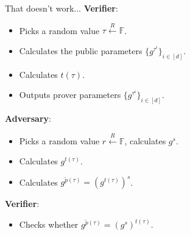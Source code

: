 \documentclass{zkdl-presentation-template}
\begin{document}
    \begin{frame}{That doesn't work...}
        \textbf{Verifier}: 
        \vspace{-5pt}
        \begin{itemize}[label=]
            \item \vspace{-3pt} Picks a random value $\tau \xleftarrow{R} \mathbb{F}$. \pause
            \item \vspace{-3pt} Calculates the public parameters $\{g^{\tau^i}\}_{i \in [d]}$. \pause
            \item \vspace{-3pt} Calculates $t(\tau)$. \pause
            \item \vspace{-3pt} Outputs prover parameters $\{g^{\tau^i}\}_{i \in [d]}$. \pause
        \end{itemize}
        \textbf{Adversary}: 
        \vspace{-5pt}
        \begin{itemize}[label=]
            \item \vspace{-3pt} Picks a random value $r \xleftarrow{R} \mathbb{F}$, calculates $g^s$. \pause
            \item \vspace{-3pt} Calculates $g^{t(\tau)}$. \pause
            \item \vspace{-3pt} Calculates $g^{\widetilde{p}(\tau)} = {\left( g^{t(\tau)} \right)}^s$. \pause
        \end{itemize}
        \textbf{Verifier}: 
        \vspace{-5pt}
        \begin{itemize}[label=]
            \item \vspace{-3pt} Checks whether $g^{\widetilde{p}(\tau)} = \left( g^{s} \right)^{t(\tau)}$.
        \end{itemize}
    \end{frame}
\end{document}
